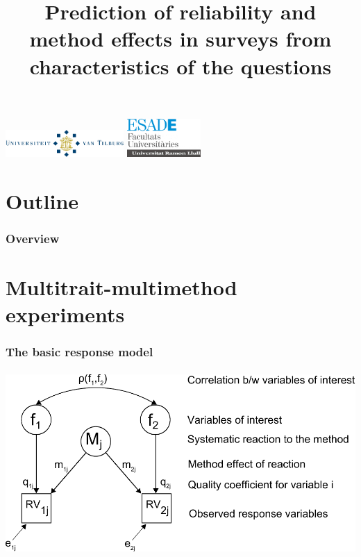 \documentclass{beamer}
\title{Prediction of reliability and method effects in surveys from characteristics of the questions}
\institute
{
  \inst{}%
  Faculty of Social and Behavioural Sciences\\
  Tilburg University
  \and
  \inst{}%
  Survey Research Centre of Catalunya\\
  ESADE, Barcelona\\
  Universitat Ramon Llull\vspace{-1.2cm}
}
\date{}
\begin{document}
\begin{frame}
	\titlepage
	\begin{center}
	 \includegraphics[width=4.5cm]{i/uvttransparent.png}\hspace{.2cm}
	 \includegraphics[width=2.8cm]{i/esade.png}	
  \end{center}	
\end{frame}

\section*{Outline}

\begin{frame}
\frametitle{Overview}
	\tableofcontents
\end{frame}

\section{Multitrait-multimethod experiments}

\begin{frame}
	\frametitle{The basic response model}
	\includegraphics[height=7cm]{i/response-model.pdf}\\
\end{frame}
\end{document}
